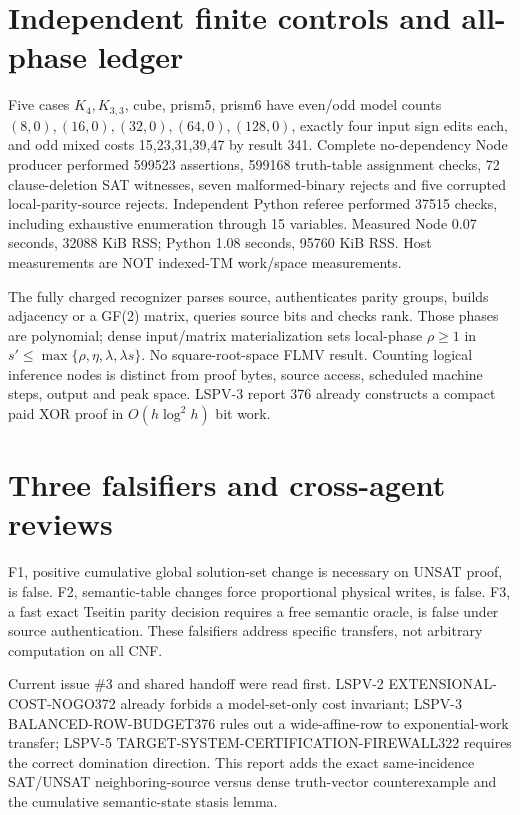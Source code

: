 \documentclass[11pt]{article}
\begin{document}
\section*{Independent finite controls and all-phase ledger}
Five cases $K_4,K_{3,3}$, cube, prism5, prism6 have even/odd model counts $(8,0),(16,0),(32,0),(64,0),(128,0)$, exactly four input sign edits each, and odd mixed costs 15,23,31,39,47 by result 341. Complete no-dependency Node producer performed 599523 assertions, 599168 truth-table assignment checks, 72 clause-deletion SAT witnesses, seven malformed-binary rejects and five corrupted local-parity-source rejects. Independent Python referee performed 37515 checks, including exhaustive enumeration through 15 variables. Measured Node 0.07 seconds, 32088 KiB RSS; Python 1.08 seconds, 95760 KiB RSS. Host measurements are NOT indexed-TM work/space measurements.

The fully charged recognizer parses source, authenticates parity groups, builds adjacency or a GF(2) matrix, queries source bits and checks rank. Those phases are polynomial; dense input/matrix materialization sets local-phase $\rho\ge1$ in $s'\le\max\{\rho,\eta,\lambda,\lambda s\}$. No square-root-space FLMV result. Counting logical inference nodes is distinct from proof bytes, source access, scheduled machine steps, output and peak space. LSPV-3 report 376 already constructs a compact paid XOR proof in $O(h\log^2 h)$ bit work.

\section*{Three falsifiers and cross-agent reviews}
F1, positive cumulative global solution-set change is necessary on UNSAT proof, is false. F2, semantic-table changes force proportional physical writes, is false. F3, a fast exact Tseitin parity decision requires a free semantic oracle, is false under source authentication. These falsifiers address specific transfers, not arbitrary computation on all CNF.

Current issue \#3 and shared handoff were read first. LSPV-2 EXTENSIONAL-COST-NOGO372 already forbids a model-set-only cost invariant; LSPV-3 BALANCED-ROW-BUDGET376 rules out a wide-affine-row to exponential-work transfer; LSPV-5 TARGET-SYSTEM-CERTIFICATION-FIREWALL322 requires the correct domination direction. This report adds the exact same-incidence SAT/UNSAT neighboring-source versus dense truth-vector counterexample and the cumulative semantic-state stasis lemma.
\end{document}
